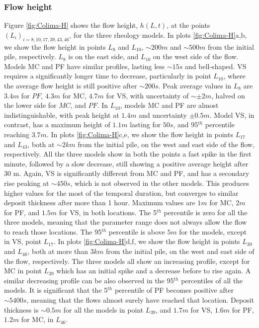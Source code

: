 \documentclass{article}
\begin{document}
\subsubsection{Flow height}
Figure \ref{fig:Colima-H} shows the flow height, $h(L,t)$, at the points $(L_i)_{i=8,10,17,39,43,46}$, for the three rheology models. In plots \ref{fig:Colima-H}a,b, we show the flow height in points $L_8$ and $L_{10}$, $\sim 200 m$ and $\sim 500 m$ from the initial pile, respectively. $L_8$ is on the east side, and $L_{10}$ on the west side of the flow. Models MC and PF have similar profiles, lasting less $\sim 15 s$ and bell-shaped. VS requires a significantly longer time to decrease, particularly in point $L_{10}$, where the average flow height is still positive after $\sim 200 s$. Peak average values in $L_8$ are $3.4 m$ for $PF$, $4.3 m$ for MC, $4.7 m$ for VS, with uncertainty of $\sim \pm 2 m$, halved on the lower side for $MC$, and $PF$. In $L_{10}$, models MC and PF are almost indistinguishable, with peak height at $1.4 m$ and uncertainty $\pm 0.5 m$. Model VS, in contrast, has a maximum height of $1.1 m$ lasting for $50s$, and 95$^{th}$ percentile reaching $3.7 m$. In plots \ref{fig:Colima-H}c,e, we show the flow height in points $L_{17}$ and $L_{43}$, both at $\sim 2 km$ from the initial pile, on the west and east side of the flow, respectively. All the three models show in both the points a fast spike in the first minute, followed by a slow decrease, still showing a positive average height after 30 m. Again, VS is significantly different from MC and PF, and has a secondary rise peaking at $\sim 450 s$, which is not observed in the other models. This produces higher values for the most of the temporal duration, but converges to similar deposit thickness after more than 1 hour. Maximum values are $1 m$ for MC, $2 m$ for PF, and $1.5 m$ for VS, in both locations. The 5$^{th}$ percentile is zero for all the three models, meaning that the parameter range does not always allow the flow to reach those locations. The 95$^{th}$ percentile is above $5m$ for the models, except in VS, point $L_{17}$. In plots \ref{fig:Colima-H}d,f, we show the flow height in points $L_{39}$ and $L_{46}$, both at more than $3 km$ from the initial pile, on the west and east side of the flow, respectively. The three models all show an increasing profile, except for MC in point $L_{39}$ which has an initial spike and a decrease before to rise again. A similar decreasing profile can be also observed in the 95$^{th}$ percentiles of all the models. It is significant that the 5$^{th}$ percentile of PF becomes positive after $\sim 5400 s$, meaning that the flows almost surely have reached that location. Deposit thickness is $\sim 0.5 m$ for all the models in point $L_{39}$, and $1.7 m$ for VS, $1.6 m$ for PF, $1.2 m$ for MC, in $L_{46}$.
\end{document}
